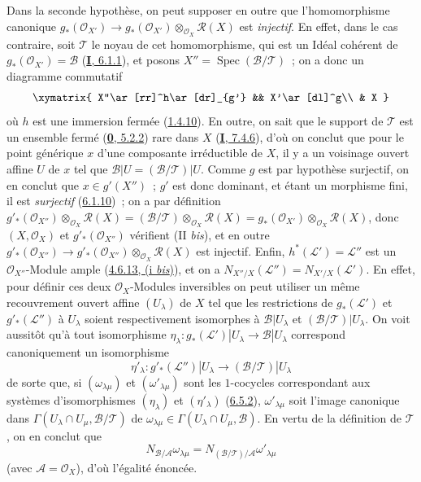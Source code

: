 Dans la seconde hypothèse, on peut supposer en outre que l'homomorphisme
canonique
$g_*(\mathcal{O}_{X'})\to
g_*(\mathcal{O}_{X'})\otimes_{\mathcal{O}_X}\mathcal{R}(X)$ est
\emph{injectif}. En effet, dans le cas contraire, soit $\mathcal{T}$
le noyau de cet homomorphisme, qui est un Idéal cohérent de
$g_*(\mathcal{O}_{X'})=\mathcal{B}$
(\hyperref[I.6.1.1-fr]{\textbf{I}, 6.1.1}), et posons
$X''=\operatorname{Spec}(\mathcal{B}/\mathcal{T})$~; on a donc un diagramme
commutatif
\[
\xymatrix{
X''\ar[rr]^h\ar[dr]_{g'} && X'\ar[dl]^g\\
& X
}
\]
où $h$ est une immersion fermée (\hyperref[II.1.4.10-fr]{1.4.10}). En outre,
on sait que le support de $\mathcal{T}$ est un ensemble fermé
(\hyperref[0.5.2.2-fr]{\textbf{0}, 5.2.2}) rare dans $X$
(\hyperref[I.7.4.6-fr]{\textbf{I}, 7.4.6}), d'où on conclut que pour le point générique
$x$ d'une composante irréductible de $X$, il y a un voisinage ouvert affine
$U$ de $x$ tel que
$\mathcal{B}|U=(\mathcal{B}/\mathcal{T})|U$. Comme $g$ est par hypothèse
surjectif, on en conclut que $x\in g'(X'')$~; $g'$ est donc dominant, et étant
un morphisme fini, il est \emph{surjectif}
(\hyperref[II.6.1.10-fr]{6.1.10})~; on a par définition
$g'_*(\mathcal{O}_{X''})\otimes_{\mathcal{O}_X}\mathcal{R}(X)
=(\mathcal{B}/\mathcal{T})\otimes_{\mathcal{O}_X}\mathcal{R}(X)
=g_*(\mathcal{O}_{X'})\otimes_{\mathcal{O}_X}\mathcal{R}(X)$,
donc $(X,\mathcal{O}_X)$ et $g'_*(\mathcal{O}_{X''})$ vérifient
(II \emph{bis}), et en outre
$g'_*(\mathcal{O}_{X''})\to
g'_*(\mathcal{O}_{X''})\otimes_{\mathcal{O}_X}\mathcal{R}(X)$
est injectif. Enfin, $h^*(\mathcal{L}')=\mathcal{L}''$ est un
$\mathcal{O}_{X''}$-Module ample
(\hyperref[II.4.6.13-fr]{4.6.13, (i \emph{bis})}), et on a
$N_{X''/X}(\mathcal{L}'')=N_{X'/X}(\mathcal{L}')$. En effet, pour définir
ces deux $\mathcal{O}_X$-Modules inversibles on peut utiliser un même
recouvrement ouvert affine $(U_\lambda)$ de $X$ tel que les restrictions de
$g_*(\mathcal{L}')$ et $g'_*(\mathcal{L}'')$ à $U_\lambda$ soient
respectivement isomorphes à $\mathcal{B}|U_\lambda$ et
$(\mathcal{B}/\mathcal{T})|U_\lambda$. On voit aussitôt qu'à tout
isomorphisme
$\eta_\lambda:g_*(\mathcal{L}')|U_\lambda\to\mathcal{B}|U_\lambda$
correspond canoniquement un isomorphisme
\[
\eta'_\lambda:g'_*(\mathcal{L}'')|U_\lambda\longrightarrow
(\mathcal{B}/\mathcal{T})|U_\lambda
\]
de sorte que, si $(\omega_{\lambda\mu})$ et
$(\omega'_{\lambda\mu})$ sont les $1$-cocycles correspondant aux systèmes
d'isomorphismes $(\eta_\lambda)$ et $(\eta'_\lambda)$
(\hyperref[II.6.5.2-fr]{6.5.2}), $\omega'_{\lambda\mu}$ soit l'image
canonique dans
$\Gamma(U_\lambda\cap U_\mu,\mathcal{B}/\mathcal{T})$ de
$\omega_{\lambda\mu}\in\Gamma(U_\lambda\cap U_\mu,\mathcal{B})$. En vertu
de la définition de $\mathcal{T}$, on en conclut que
\[
N_{\mathcal{B}/\mathcal{A}}\omega_{\lambda\mu}
=N_{(\mathcal{B}/\mathcal{T})/\mathcal{A}}\omega'_{\lambda\mu}
\]
(avec $\mathcal{A}=\mathcal{O}_X$), d'où l'égalité énoncée.

